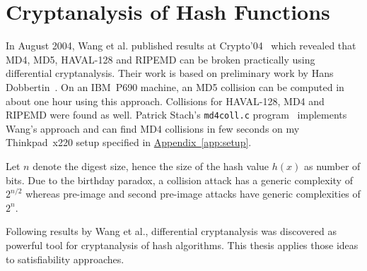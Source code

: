 \section{Cryptanalysis of Hash Functions}
\label{sec:intro-cryptanalysis}
%
In August 2004, Wang et al. published results at Crypto'04~\cite{wang2004} which revealed
that MD4, MD5, HAVAL-128 and RIPEMD can be broken practically using differential cryptanalysis.
Their work is based on preliminary work by Hans Dobbertin~\cite{Dobbertin1998}.
On an IBM~P690 machine, an MD5 collision can be computed in about one hour using this approach.
Collisions for HAVAL-128, MD4 and RIPEMD were found as well. Patrick Stach's \texttt{md4coll.c}
program~\cite{md4coll} implements Wang's approach and can find MD4 collisions in few seconds
on my Thinkpad~x220 setup specified in \hyperref[app:setup]{Appendix~\ref{app:setup}}.

Let $n$ denote the digest size, hence the size of the hash value $h(x)$ as number of bits.
Due to the birthday paradox, a collision attack has a generic complexity of $2^{n/2}$
whereas pre-image and second pre-image attacks have generic complexities of $2^n$.

Following results by Wang et al., differential cryptanalysis was discovered as
powerful tool for cryptanalysis of hash algorithms. This thesis applies those
ideas to satisfiability approaches.

